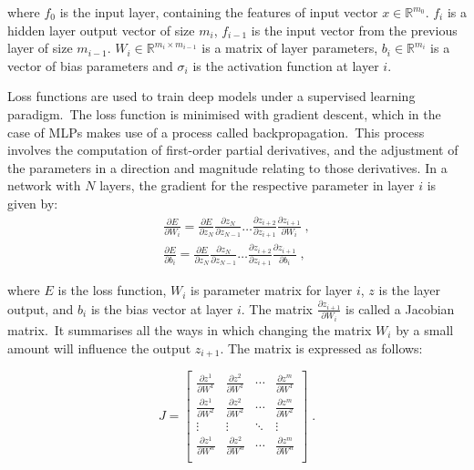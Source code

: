 \noindent where $ f_0 $ is the input layer, containing the features of input vector $ x \in \mathbb{R}^{m_0} $. $ f_i $ is a hidden layer output vector of size $ m_i $, $ f_{i - 1} $ is the input vector from the previous layer of size $ m_{i-1} $. $ W_{i} \in \mathbb{R}^{m_i \times m_{i - 1}} $ is a matrix of layer parameters, $ b_{i} \in \mathbb{R}^{m_i} $ is a vector of bias parameters and $ \sigma_i $ is the activation function at layer $ i $.

\noindent Loss functions are used to train deep models under a supervised learning paradigm.\ The loss function is minimised with gradient descent, which in the case of MLPs makes use of a process called backpropagation.\ This process involves the computation of first-order partial derivatives, and the adjustment of the parameters in a direction and magnitude relating to those derivatives. In a network with $ N $ layers, the gradient for the respective parameter in layer $ i $ is given by:
\begin{subequations}
	\begin{gather}
		\frac{\partial E} {\partial W_i} = \frac{\partial E} {\partial z_N}\frac{\partial z_N} {\partial z_{N - 1}}  \dots \frac{\partial z_{i + 2}} {\partial z_{i + 1}}\frac{\partial z_{i + 1}} {\partial W_{i}} \; , \\
		\frac{\partial E} {\partial b_i} = \frac{\partial E} {\partial z_N}\frac{\partial z_N} {\partial z_{N - 1}}  \dots \frac{\partial z_{i + 2}} {\partial z_{i + 1}}\frac{\partial z_{i + 1}} {\partial b_{i}} \; ,
	\end{gather}
\end{subequations}

\noindent where $ E $ is the loss function, $ W_i $ is parameter matrix for layer $ i $, $ z $ is the layer output, and $ b_i $ is the bias vector at layer $ i $. The matrix $ \frac{\partial z_{i + 1}} {\partial W_i} $ is called a Jacobian matrix.\ It summarises all the ways in which changing the matrix $ W_i $ by a small amount will influence the output $ z_{i + 1} $. The matrix is expressed as follows: \par
\begin{equation}
	\renewcommand\arraystretch{2}
	J = \begin{bmatrix}
        		\frac{\partial z^1}{\partial W^1} & \frac{\partial z^2}{\partial W^1} & \cdots & \frac{\partial z^m}{\partial W^1} \\
           	\frac{\partial z^1}{\partial W^2} &\frac{\partial z^2}{\partial W^2} & \cdots & \frac{\partial z^m}{\partial W^2} \\
           	\vdots & \vdots & \ddots & \vdots \\
           	\frac{\partial z^1}{\partial W^n} & \frac{\partial z^2}{\partial W^n} & \cdots & \frac{\partial z^m}{\partial W^n} \\
        \end{bmatrix} \; .
\end{equation}

